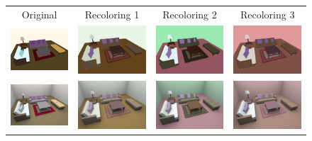\begin{figure}[t]
\begin{tabular}{c|ccc} 
Original&Recoloring 1&Recoloring 2&Recoloring 3\vspace{0.4em}\\
\includegraphics[width=.23\linewidth]{figs/3dscene/original}&\includegraphics[width=.23\linewidth]{figs/3dscene/recolored_00}&\includegraphics[width=.23\linewidth]{figs/3dscene/recolored_01}&\includegraphics[width=.23\linewidth]{figs/3dscene/recolored_05}\vspace{0.4em}\\
\includegraphics[width=.23\linewidth]{figs/3dscene/original_pbrt}&\includegraphics[width=.23\linewidth]{figs/3dscene/recolored_00_pbrt}&\includegraphics[width=.23\linewidth]{figs/3dscene/recolored_01_pbrt}&\includegraphics[width=.23\linewidth]{figs/3dscene/recolored_05_pbrt}\vspace{0.4em}\\
\end{tabular}


\end{figure}
